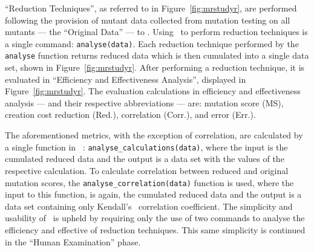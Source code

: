 ``Reduction Techniques'', as referred to in Figure~\ref{fig:mrstudyr}, are performed following the provision
of mutant data collected from mutation testing on all mutants --- the ``Original Data'' --- to \mr. Using
\mr~to perform reduction techniques is a single command: \texttt{analyse(data)}. Each reduction technique performed by
the \texttt{analyse} function returns reduced data which is then cumulated into a single data set, shown in
Figure~\ref{fig:mrstudyr}. After performing a reduction technique, it is evaluated in ``Efficiency and Effectiveness
Analysis'', displayed in Figure~\ref{fig:mrstudyr}.
The evaluation calculations in efficiency and effectiveness analysis --- and their respective abbreviations --- are: mutation score
(MS), creation cost reduction (Red.), correlation (Corr.), and error (Err.).


The aforementioned metrics, with the exception of correlation, are calculated by a single function in \mr~:
\texttt{analyse\_calculations(data)}, where the input is the cumulated reduced data and the output is a data set with the
values of the respective calculation. To calculate correlation between reduced and original mutation scores, the
\texttt{analyse\_correlation(data)} function is used, where the input to this function, is again, the cumulated reduced data
and the output is a data set containing only Kendall's \taub~correlation coefficient. The simplicity and usability of \mr~is
upheld by requiring only the use of two commands to analyse the efficiency and effective of reduction techniques. This same
simplicity is continued in the ``Human Examination'' phase.


